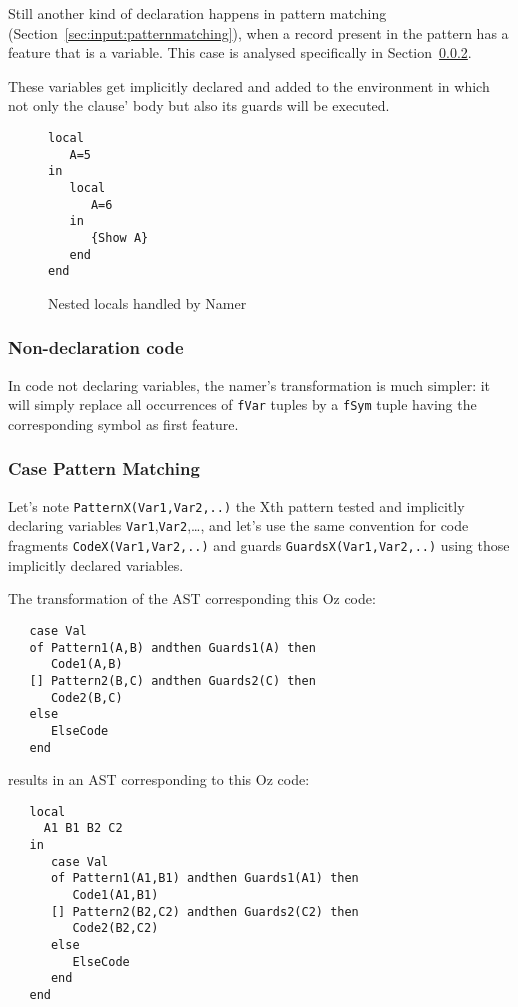 \documentclass[a4paper]{memoir}
\begin{document}
Still another kind of declaration happens in pattern matching
(Section~\ref{sec:input:patternmatching}), when a record present in the pattern
has a feature that is a variable. This case is analysed specifically in
Section~\ref{sec:arch:namer:patternmatching}.

These variables get implicitly declared and added to the environment in which not only the clause' body but also its guards will be executed.


\begin{figure}
\begin{lstlisting}
local
   A=5
in
   local 
      A=6
   in
      {Show A}
   end
end
\end{lstlisting}
\caption{Nested locals handled by Namer}
\label{fig:namer_nested_locals}
\end{figure}


\subsubsection{Non-declaration code}
In code not declaring variables, the namer's transformation is much simpler: it will simply
replace all occurrences of \lstinline!fVar! tuples by a \lstinline!fSym! tuple having the corresponding symbol as first feature.


\subsubsection{Case Pattern Matching}\label{sec:arch:namer:patternmatching}
 Let's note
\lstinline!PatternX(Var1,Var2,..)! the Xth pattern tested and implicitly
declaring variables \lstinline!Var1!,\lstinline!Var2!,\ldots, and let's use the same convention for code fragments \lstinline!CodeX(Var1,Var2,..)! and guards \lstinline!GuardsX(Var1,Var2,..)! using those implicitly declared variables.

The transformation of the AST corresponding this Oz code:
\begin{lstlisting}
   case Val
   of Pattern1(A,B) andthen Guards1(A) then
      Code1(A,B)
   [] Pattern2(B,C) andthen Guards2(C) then
      Code2(B,C)
   else
      ElseCode
   end
\end{lstlisting}
results in an AST corresponding to this Oz code:
\begin{lstlisting}
   local
     A1 B1 B2 C2
   in
      case Val
      of Pattern1(A1,B1) andthen Guards1(A1) then
         Code1(A1,B1)
      [] Pattern2(B2,C2) andthen Guards2(C2) then
         Code2(B2,C2)
      else
         ElseCode
      end
   end
\end{lstlisting}
\end{document}
